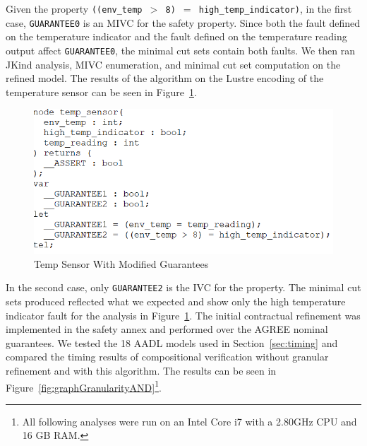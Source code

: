 Given the property \texttt{((env\_temp $>$ 8) $=$ high\_temp\_indicator)}, in the first case, \texttt{GUARANTEE0} is an MIVC for the safety property. Since both the fault defined on the temperature indicator and the fault defined on the temperature reading output affect \texttt{GUARANTEE0}, the minimal cut sets contain both faults. We then ran JKind analysis, MIVC enumeration, and minimal cut set computation on the refined model. The results of the algorithm on the Lustre encoding of the temperature sensor can be seen in Figure~\ref{fig:lustreTwoGuar}. 

\begin{figure}[h!]
\begin{center}
\includegraphics[width=.8\textwidth]{images/lustreOneGuar.PNG}
\caption{Temp Sensor With Modified Guarantees} \label{fig:lustreTwoGuar}
\end{center}
\end{figure} 

 In the second case, only \texttt{GUARANTEE2} is the IVC for the property. The minimal cut sets produced reflected what we expected and show only the high temperature indicator fault for the analysis in Figure~\ref{fig:lustreTwoGuar}. The initial contractual refinement was implemented in the safety annex and performed over the AGREE nominal guarantees. We tested the 18 AADL models used in Section~\ref{sec:timing} and compared the timing results of compositional verification without granular refinement and with this algorithm. The results can be seen in Figure~\ref{fig:graphGranularityAND}\footnote{All following analyses were run on an Intel Core i7 with a 2.80GHz CPU and 16 GB RAM. }. 

